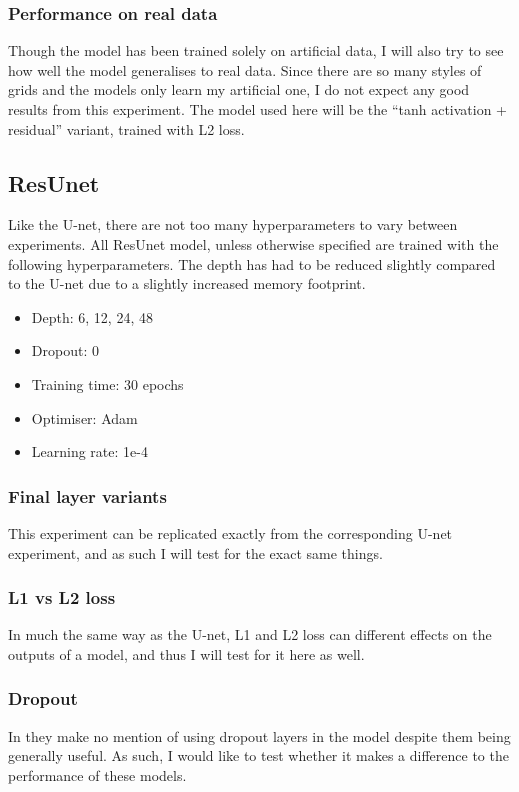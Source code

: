 \subsubsection{Performance on real data}
Though the model has been trained solely on artificial data, I will also try to see how well the model generalises to real data. Since there are so many styles of grids and the models only learn my artificial one, I do not expect any good results from this experiment. The model used here will be the ``tanh activation + residual'' variant, trained with L2 loss.

\subsection{ResUnet}
Like the U-net, there are not too many hyperparameters to vary between experiments. All ResUnet model, unless otherwise specified are trained with the following hyperparameters. The depth has had to be reduced slightly compared to the U-net due to a slightly increased memory footprint.
\begin{itemize}
\item Depth: 6, 12, 24, 48
\item Dropout: 0
\item Training time: 30 epochs
\item Optimiser: Adam
\item Learning rate: 1e-4
\end{itemize}

\subsubsection{Final layer variants}
This experiment can be replicated exactly from the corresponding U-net experiment, and as such I will test for the exact same things.
\subsubsection{L1 vs L2 loss}
In much the same way as the U-net, L1 and L2 loss can different effects on the outputs of a model, and thus I will test for it here as well.
\subsubsection{Dropout}
In \cite{resunet} they make no mention of using dropout layers in the model despite them being generally useful. As such, I would like to test whether it makes a difference to the performance of these models.
